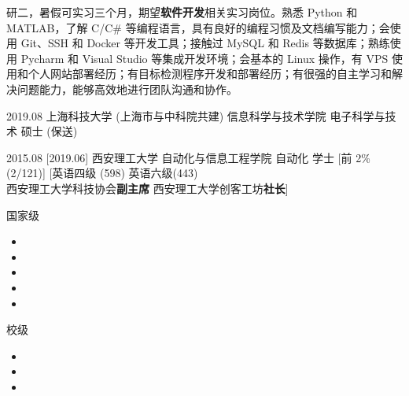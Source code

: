 \documentclass[zh]{resume}
\begin{document}
\makeheader

{\onehalfspacing\hspace{2em}%
    研二，暑假可实习三个月，期望\textbf{软件开发}相关实习岗位。熟悉 Python 和 MATLAB，了解 C/C\# 等编程语言，具有良好的编程习惯及文档编写能力；会使用 Git、SSH 和 Docker 等开发工具；接触过 MySQL 和 Redis 等数据库；熟练使用 Pycharm 和 Visual Studio 等集成开发环境；会基本的 Linux 操作，有 VPS 使用和个人网站部署经历；有目标检测程序开发和部署经历；有很强的自主学习和解决问题能力，能够高效地进行团队沟通和协作。
    \par}

\begin{educations}
    \education%
    {2019.08}%
    {上海科技大学 (上海市与中科院共建) }%
    {信息科学与技术学院}%
    {电子科学与技术}%
    {硕士 (保送)}

    \separator{0.5ex}
    \education%
    {2015.08}%
    [2019.06]%
    {西安理工大学}%
    {自动化与信息工程学院}%
    {自动化}%
    {学士}
    [前 2\% (2/121)]
    [英语四级 (598) \textbullet 英语六级(443) \\
    西安理工大学科技协会\textbf{副主席} \textbullet 西安理工大学创客工坊\textbf{社长}]
\end{educations}

\begin{awards}
    \award
    {国家级}
    {
        \begin{itemize}
            \item {}
            \item {}
            \item {}
            \item {}
            \item {}
        \end{itemize}
    }
    \separator{0.5ex}
    \award
    {校级}
    {
        \begin{itemize}
            \item {}
            \item {}
            \item {}
        \end{itemize}
    }
\end{awards}
\end{document}
